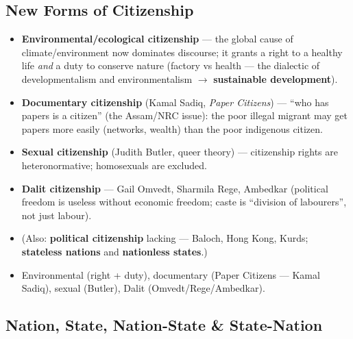 \sectiondivider

\subsection{New Forms of Citizenship}

\begin{DataFact}
\begin{itemize}
\item \textbf{Environmental/ecological citizenship} --- the global cause of climate/environment now dominates discourse; it grants a right to a healthy life \textit{and} a duty to conserve nature (factory vs health --- the dialectic of developmentalism and environmentalism $\rightarrow$ \textbf{sustainable development}).
\item \textbf{Documentary citizenship} (Kamal Sadiq, \textit{Paper Citizens}) --- ``who has papers is a citizen'' (the Assam/NRC issue): the poor illegal migrant may get papers more easily (networks, wealth) than the poor indigenous citizen.
\item \textbf{Sexual citizenship} (Judith Butler, queer theory) --- citizenship rights are heteronormative; homosexuals are excluded.
\item \textbf{Dalit citizenship} --- Gail Omvedt, Sharmila Rege, Ambedkar (political freedom is useless without economic freedom; caste is ``division of labourers'', not just labour).
\item (Also: \textbf{political citizenship} lacking --- Baloch, Hong Kong, Kurds; \textbf{stateless nations} and \textbf{nationless states}.)
\end{itemize}
\end{DataFact}

\begin{QuickRevision}
\begin{itemize}
\item Environmental (right + duty), documentary (Paper Citizens --- Kamal Sadiq), sexual (Butler), Dalit (Omvedt/Rege/Ambedkar).
\end{itemize}
\end{QuickRevision}

\sectiondivider

\subsection{Nation, State, Nation-State \& State-Nation}

